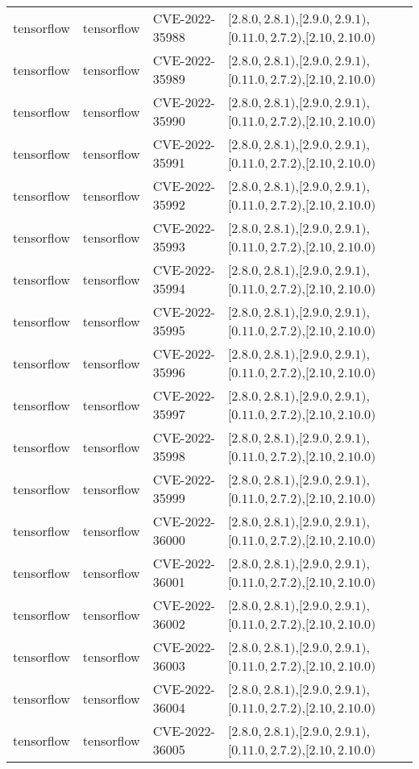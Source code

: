 \begin{tabular}{llll}
tensorflow & tensorflow & CVE-2022-35988 & $[2.8.0,2.8.1)$,$[2.9.0,2.9.1)$,$[0.11.0,2.7.2)$,$[2.10,2.10.0)$ \\
tensorflow & tensorflow & CVE-2022-35989 & $[2.8.0,2.8.1)$,$[2.9.0,2.9.1)$,$[0.11.0,2.7.2)$,$[2.10,2.10.0)$ \\
tensorflow & tensorflow & CVE-2022-35990 & $[2.8.0,2.8.1)$,$[2.9.0,2.9.1)$,$[0.11.0,2.7.2)$,$[2.10,2.10.0)$ \\
tensorflow & tensorflow & CVE-2022-35991 & $[2.8.0,2.8.1)$,$[2.9.0,2.9.1)$,$[0.11.0,2.7.2)$,$[2.10,2.10.0)$ \\
tensorflow & tensorflow & CVE-2022-35992 & $[2.8.0,2.8.1)$,$[2.9.0,2.9.1)$,$[0.11.0,2.7.2)$,$[2.10,2.10.0)$ \\
tensorflow & tensorflow & CVE-2022-35993 & $[2.8.0,2.8.1)$,$[2.9.0,2.9.1)$,$[0.11.0,2.7.2)$,$[2.10,2.10.0)$ \\
tensorflow & tensorflow & CVE-2022-35994 & $[2.8.0,2.8.1)$,$[2.9.0,2.9.1)$,$[0.11.0,2.7.2)$,$[2.10,2.10.0)$ \\
tensorflow & tensorflow & CVE-2022-35995 & $[2.8.0,2.8.1)$,$[2.9.0,2.9.1)$,$[0.11.0,2.7.2)$,$[2.10,2.10.0)$ \\
tensorflow & tensorflow & CVE-2022-35996 & $[2.8.0,2.8.1)$,$[2.9.0,2.9.1)$,$[0.11.0,2.7.2)$,$[2.10,2.10.0)$ \\
tensorflow & tensorflow & CVE-2022-35997 & $[2.8.0,2.8.1)$,$[2.9.0,2.9.1)$,$[0.11.0,2.7.2)$,$[2.10,2.10.0)$ \\
tensorflow & tensorflow & CVE-2022-35998 & $[2.8.0,2.8.1)$,$[2.9.0,2.9.1)$,$[0.11.0,2.7.2)$,$[2.10,2.10.0)$ \\
tensorflow & tensorflow & CVE-2022-35999 & $[2.8.0,2.8.1)$,$[2.9.0,2.9.1)$,$[0.11.0,2.7.2)$,$[2.10,2.10.0)$ \\
tensorflow & tensorflow & CVE-2022-36000 & $[2.8.0,2.8.1)$,$[2.9.0,2.9.1)$,$[0.11.0,2.7.2)$,$[2.10,2.10.0)$ \\
tensorflow & tensorflow & CVE-2022-36001 & $[2.8.0,2.8.1)$,$[2.9.0,2.9.1)$,$[0.11.0,2.7.2)$,$[2.10,2.10.0)$ \\
tensorflow & tensorflow & CVE-2022-36002 & $[2.8.0,2.8.1)$,$[2.9.0,2.9.1)$,$[0.11.0,2.7.2)$,$[2.10,2.10.0)$ \\
tensorflow & tensorflow & CVE-2022-36003 & $[2.8.0,2.8.1)$,$[2.9.0,2.9.1)$,$[0.11.0,2.7.2)$,$[2.10,2.10.0)$ \\
tensorflow & tensorflow & CVE-2022-36004 & $[2.8.0,2.8.1)$,$[2.9.0,2.9.1)$,$[0.11.0,2.7.2)$,$[2.10,2.10.0)$ \\
tensorflow & tensorflow & CVE-2022-36005 & $[2.8.0,2.8.1)$,$[2.9.0,2.9.1)$,$[0.11.0,2.7.2)$,$[2.10,2.10.0)$ \\

\end{tabular}
